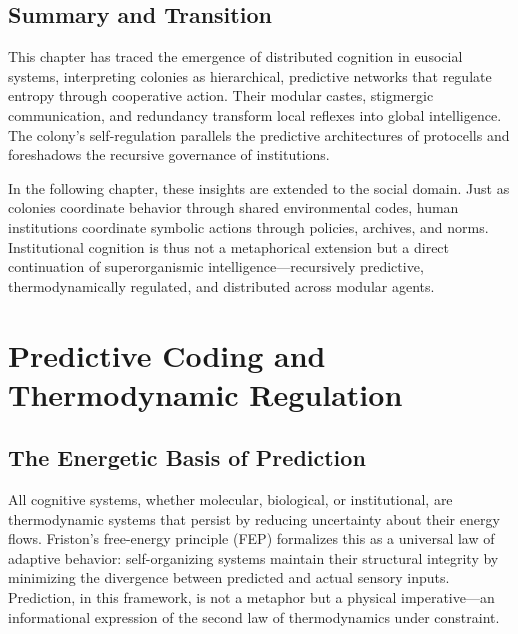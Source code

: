 \documentclass[11pt,a4paper]{article}
\begin{document}
\subsection{Summary and Transition}

This chapter has traced the emergence of distributed cognition in eusocial systems, interpreting colonies as hierarchical, predictive networks that regulate entropy through cooperative action.  Their modular castes, stigmergic communication, and redundancy transform local reflexes into global intelligence.  The colony’s self-regulation parallels the predictive architectures of protocells and foreshadows the recursive governance of institutions.

In the following chapter, these insights are extended to the social domain.  Just as colonies coordinate behavior through shared environmental codes, human institutions coordinate symbolic actions through policies, archives, and norms.  Institutional cognition is thus not a metaphorical extension but a direct continuation of superorganismic intelligence—recursively predictive, thermodynamically regulated, and distributed across modular agents.


\section{Predictive Coding and Thermodynamic Regulation}
\label{sec:predictive-thermo}

\subsection{The Energetic Basis of Prediction}

All cognitive systems, whether molecular, biological, or institutional, are thermodynamic systems that persist by reducing uncertainty about their energy flows.  Friston’s free-energy principle (FEP) \citep{Friston2010FreeEnergyPrinciple, Friston2013LifeAsWeKnowIt} formalizes this as a universal law of adaptive behavior: self-organizing systems maintain their structural integrity by minimizing the divergence between predicted and actual sensory inputs.  Prediction, in this framework, is not a metaphor but a physical imperative—an informational expression of the second law of thermodynamics under constraint.
\end{document}
